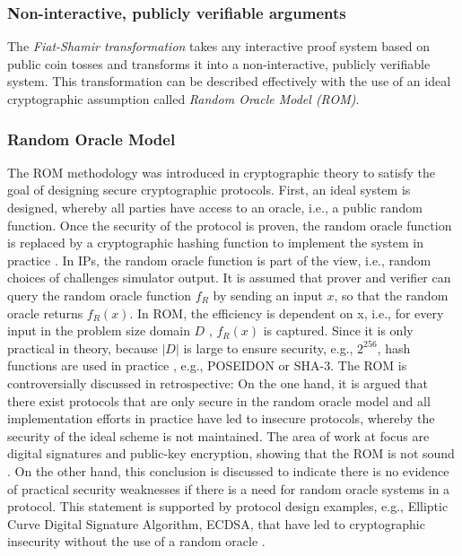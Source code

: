 \subsubsection{Non-interactive, publicly verifiable arguments}
The \textit{Fiat-Shamir transformation} takes any interactive proof system based on public coin tosses and transforms it into a non-interactive, publicly verifiable system. This transformation can be described effectively with the use of an ideal cryptographic assumption called \textit{Random Oracle Model (ROM)}. 
\subsubsection{Random Oracle Model}
The ROM methodology was introduced in cryptographic theory to satisfy the goal of designing secure cryptographic protocols. First, an ideal system is designed, whereby all parties have access to an oracle, i.e., a public random function. Once the security of the protocol is proven, the random oracle function is replaced by a cryptographic hashing function to implement the system in practice \citep{ROMBellare}. In IPs, the random oracle function is part of the view, i.e., random choices of challenges simulator output. It is assumed that prover and verifier can query the random oracle function \(f_R\) by sending an input \(x\), so that the random oracle returns \(f_R(x)\). In ROM, the efficiency is dependent on x, i.e., for every input in the problem size domain \(D\) , \(f_R(x)\) is captured. Since it is only practical in theory, because \(|D|\) is large to ensure security, e.g., \(2^{256}\), hash functions are used in practice \citep{ROMBellare, Thaler}, e.g., POSEIDON or SHA-3. The ROM is controversially discussed in retrospective: On the one hand, it is argued that there exist protocols that are only secure in the random oracle model and all implementation efforts in practice have led to insecure protocols, whereby the security of the ideal scheme is not maintained. The area of work at focus are digital signatures and public-key encryption, showing that the ROM is not sound \citep{ROMCanetti}. On the other hand, this conclusion is discussed to indicate there is no evidence of practical security weaknesses if there is a need for random oracle systems in a protocol. This statement is supported by protocol design examples, e.g., Elliptic Curve Digital Signature Algorithm, ECDSA, that have led to cryptographic insecurity without the use of a random oracle \citep{ROMretroKoblitz}. 
